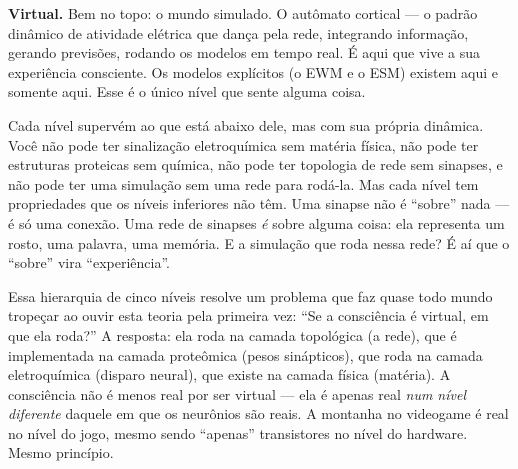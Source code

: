 \documentclass[11pt, twoside, openright]{book}
\begin{document}
\textbf{Virtual.} Bem no topo: o mundo simulado. O autômato cortical --- o padrão dinâmico de atividade elétrica que dança pela rede, integrando informação, gerando previsões, rodando os modelos em tempo real. É aqui que vive a sua experiência consciente. Os modelos explícitos (o EWM e o ESM) existem aqui e somente aqui. Esse é o único nível que sente alguma coisa.

Cada nível supervém ao que está abaixo dele, mas com sua própria dinâmica. Você não pode ter sinalização eletroquímica sem matéria física, não pode ter estruturas proteicas sem química, não pode ter topologia de rede sem sinapses, e não pode ter uma simulação sem uma rede para rodá-la. Mas cada nível tem propriedades que os níveis inferiores não têm. Uma sinapse não é ``sobre'' nada --- é só uma conexão. Uma rede de sinapses \textit{é} sobre alguma coisa: ela representa um rosto, uma palavra, uma memória. E a simulação que roda nessa rede? É aí que o ``sobre'' vira ``experiência''.

Essa hierarquia de cinco níveis resolve um problema que faz quase todo mundo tropeçar ao ouvir esta teoria pela primeira vez: ``Se a consciência é virtual, em que ela roda?'' A resposta: ela roda na camada topológica (a rede), que é implementada na camada proteômica (pesos sinápticos), que roda na camada eletroquímica (disparo neural), que existe na camada física (matéria). A consciência não é menos real por ser virtual --- ela é apenas real \textit{num nível diferente} daquele em que os neurônios são reais. A montanha no videogame é real no nível do jogo, mesmo sendo ``apenas'' transistores no nível do hardware. Mesmo princípio.
\end{document}
